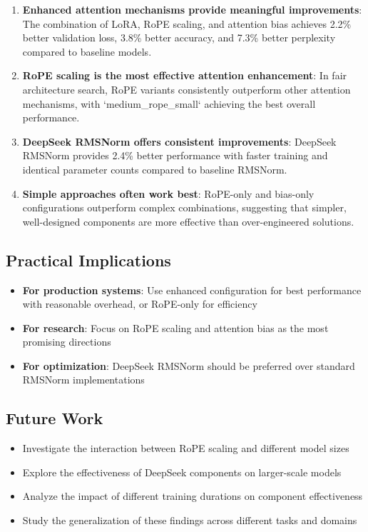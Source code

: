 \documentclass[11pt,a4paper]{article}
\begin{document}
\begin{enumerate}
    \item \textbf{Enhanced attention mechanisms provide meaningful improvements}: The combination of LoRA, RoPE scaling, and attention bias achieves 2.2\% better validation loss, 3.8\% better accuracy, and 7.3\% better perplexity compared to baseline models.
    
    \item \textbf{RoPE scaling is the most effective attention enhancement}: In fair architecture search, RoPE variants consistently outperform other attention mechanisms, with `medium_rope_small` achieving the best overall performance.
    
    \item \textbf{DeepSeek RMSNorm offers consistent improvements}: DeepSeek RMSNorm provides 2.4\% better performance with faster training and identical parameter counts compared to baseline RMSNorm.
    
    \item \textbf{Simple approaches often work best}: RoPE-only and bias-only configurations outperform complex combinations, suggesting that simpler, well-designed components are more effective than over-engineered solutions.
\end{enumerate}

\subsection{Practical Implications}

\begin{itemize}
    \item \textbf{For production systems}: Use enhanced configuration for best performance with reasonable overhead, or RoPE-only for efficiency
    \item \textbf{For research}: Focus on RoPE scaling and attention bias as the most promising directions
    \item \textbf{For optimization}: DeepSeek RMSNorm should be preferred over standard RMSNorm implementations
\end{itemize}

\subsection{Future Work}

\begin{itemize}
    \item Investigate the interaction between RoPE scaling and different model sizes
    \item Explore the effectiveness of DeepSeek components on larger-scale models
    \item Analyze the impact of different training durations on component effectiveness
    \item Study the generalization of these findings across different tasks and domains
\end{itemize}
\end{document}

